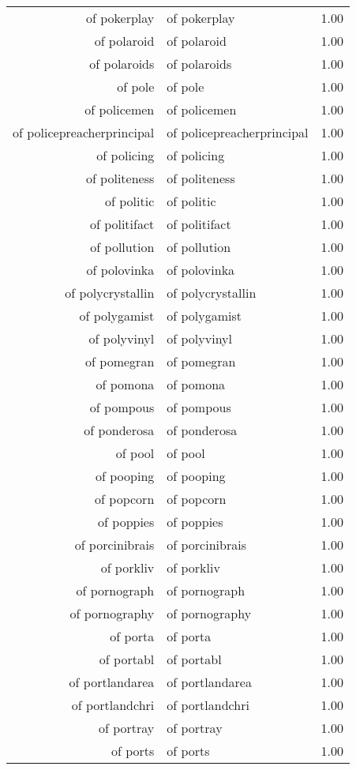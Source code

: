 \begin{table}[ht]
\begin{tabular}{rlr}
  of pokerplay & of pokerplay & 1.00 \\ 
  of polaroid & of polaroid & 1.00 \\ 
  of polaroids & of polaroids & 1.00 \\ 
  of pole & of pole & 1.00 \\ 
  of policemen & of policemen & 1.00 \\ 
  of policepreacherprincipal & of policepreacherprincipal & 1.00 \\ 
  of policing & of policing & 1.00 \\ 
  of politeness & of politeness & 1.00 \\ 
  of politic & of politic & 1.00 \\ 
  of politifact & of politifact & 1.00 \\ 
  of pollution & of pollution & 1.00 \\ 
  of polovinka & of polovinka & 1.00 \\ 
  of polycrystallin & of polycrystallin & 1.00 \\ 
  of polygamist & of polygamist & 1.00 \\ 
  of polyvinyl & of polyvinyl & 1.00 \\ 
  of pomegran & of pomegran & 1.00 \\ 
  of pomona & of pomona & 1.00 \\ 
  of pompous & of pompous & 1.00 \\ 
  of ponderosa & of ponderosa & 1.00 \\ 
  of pool & of pool & 1.00 \\ 
  of pooping & of pooping & 1.00 \\ 
  of popcorn & of popcorn & 1.00 \\ 
  of poppies & of poppies & 1.00 \\ 
  of porcinibrais & of porcinibrais & 1.00 \\ 
  of porkliv & of porkliv & 1.00 \\ 
  of pornograph & of pornograph & 1.00 \\ 
  of pornography & of pornography & 1.00 \\ 
  of porta & of porta & 1.00 \\ 
  of portabl & of portabl & 1.00 \\ 
  of portlandarea & of portlandarea & 1.00 \\ 
  of portlandchri & of portlandchri & 1.00 \\ 
  of portray & of portray & 1.00 \\ 
  of ports & of ports & 1.00 \\ 

\end{tabular}
\end{table}
